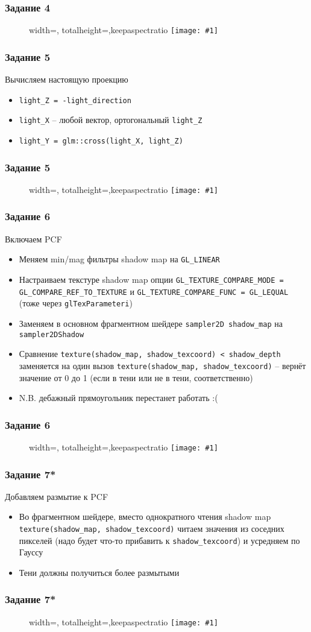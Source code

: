 \documentclass{beamer}
\newcommand{\slideimage}[1]{
  \begin{figure}
    \begin{adjustbox}{width=\textwidth, totalheight=\textheight-2\baselineskip-2\baselineskip,keepaspectratio}
      \texttt{[image: \#1]}
    \end{adjustbox}
  \end{figure}
}
\begin{document}
\begin{frame}[fragile]
\frametitle{Задание 4}
\slideimage{4.png}
\end{frame}

\begin{frame}[fragile]
\frametitle{Задание 5}
\fontsize{10pt}{10pt}
Вычисляем настоящую проекцию
\begin{itemize}
\item \verb|light_Z = -light_direction|
\item \verb|light_X| -- любой вектор, ортогональный \verb|light_Z|
\item \verb|light_Y = glm::cross(light_X, light_Z)|
\end{itemize}
\end{frame}

\begin{frame}[fragile]
\frametitle{Задание 5}
\slideimage{5.png}
\end{frame}

\begin{frame}[fragile]
\frametitle{Задание 6}
\fontsize{10pt}{10pt}
Включаем PCF
\begin{itemize}
\item Меняем min/mag фильтры shadow map на \verb|GL_LINEAR|
\item Настраиваем текстуре shadow map опции \verb|GL_TEXTURE_COMPARE_MODE = GL_COMPARE_REF_TO_TEXTURE| и \verb|GL_TEXTURE_COMPARE_FUNC = GL_LEQUAL| (тоже через \verb|glTexParameteri|)
\item Заменяем в основном фрагментном шейдере \verb|sampler2D shadow_map| на \verb|sampler2DShadow|
\item Сравнение \verb|texture(shadow_map, shadow_texcoord) < shadow_depth| заменяется на один вызов \verb|texture(shadow_map, shadow_texcoord)| -- вернёт значение от 0 до 1 (если в тени или не в тени, соответственно)
\item N.B. дебажный прямоугольник перестанет работать :(
\end{itemize}
\end{frame}

\begin{frame}[fragile]
\frametitle{Задание 6}
\slideimage{6.png}
\end{frame}

\begin{frame}[fragile]
\frametitle{Задание 7*}
\fontsize{10pt}{10pt}
Добавляем размытие к PCF
\begin{itemize}
\item Во фрагментном шейдере, вместо однократного чтения shadow map \verb|texture(shadow_map, shadow_texcoord)| читаем значения из соседних пикселей (надо будет что-то прибавить к \verb|shadow_texcoord|) и усредняем по Гауссу
\item Тени должны получиться более размытыми
\end{itemize}
\end{frame}

\begin{frame}[fragile]
\frametitle{Задание 7*}
\slideimage{7.png}
\end{frame}
\end{document}
